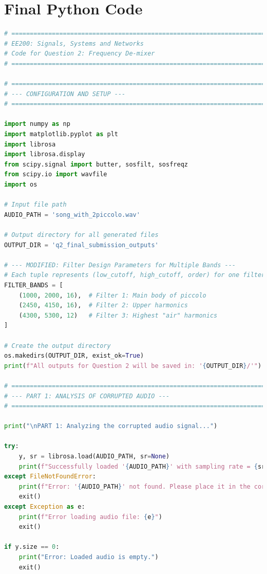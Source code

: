 \documentclass[11pt, a4paper]{article}
\begin{document}
\section{Final Python Code}
\begin{lstlisting}[language=Python, caption={Python script for Question 2.}]
# ============================================================================
# EE200: Signals, Systems and Networks
# Code for Question 2: Frequency De-mixer
# ============================================================================

# ============================================================================
# --- CONFIGURATION AND SETUP ---
# ============================================================================

import numpy as np
import matplotlib.pyplot as plt
import librosa
import librosa.display
from scipy.signal import butter, sosfilt, sosfreqz
from scipy.io import wavfile
import os

# Input file path
AUDIO_PATH = 'song_with_2piccolo.wav'

# Output directory for all generated files
OUTPUT_DIR = 'q2_final_submission_outputs'

# --- MODIFIED: Filter Design Parameters for Multiple Bands ---
# Each tuple represents (low_cutoff, high_cutoff, order) for one filter.
FILTER_BANDS = [
    (1000, 2000, 16),  # Filter 1: Main body of piccolo
    (2450, 4150, 16),  # Filter 2: Upper harmonics
    (4300, 5300, 12)   # Filter 3: Highest "air" harmonics
]

# Create the output directory
os.makedirs(OUTPUT_DIR, exist_ok=True)
print(f"All outputs for Question 2 will be saved in: '{OUTPUT_DIR}/'")

# ============================================================================
# --- PART 1: ANALYSIS OF CORRUPTED AUDIO ---
# ============================================================================

print("\nPART 1: Analyzing the corrupted audio signal...")

try:
    y, sr = librosa.load(AUDIO_PATH, sr=None)
    print(f"Successfully loaded '{AUDIO_PATH}' with sampling rate = {sr} Hz.")
except FileNotFoundError:
    print(f"Error: '{AUDIO_PATH}' not found. Please place it in the correct directory.")
    exit()
except Exception as e:
    print(f"Error loading audio file: {e}")
    exit()

if y.size == 0:
    print("Error: Loaded audio is empty.") 
    exit()


\end{lstlisting}
\end{document}
